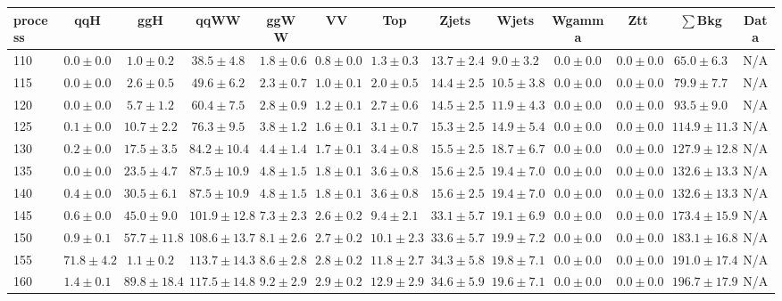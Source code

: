 \begin{table}
{%
 \tiny
 \begin{center}
 \begin{tabular}{l | c c | c c c c c c c c  | c c}
 \hline
 process & qqH & ggH & qqWW & ggWW & VV & Top & Zjets & Wjets & Wgamma & Ztt & $\sum$Bkg & Data \\
 \hline
110 & $0.0\pm0.0$ & $1.0\pm0.2$ & $38.5\pm4.8$ & $1.8\pm0.6$ & $0.8\pm0.0$ & $1.3\pm0.3$ & $13.7\pm2.4$ & $9.0\pm3.2$ & $0.0\pm0.0$ & $0.0\pm0.0$ & $65.0\pm6.3$ & N/A \\
115 & $0.0\pm0.0$ & $2.6\pm0.5$ & $49.6\pm6.2$ & $2.3\pm0.7$ & $1.0\pm0.1$ & $2.0\pm0.5$ & $14.4\pm2.5$ & $10.5\pm3.8$ & $0.0\pm0.0$ & $0.0\pm0.0$ & $79.9\pm7.7$ & N/A \\
120 & $0.0\pm0.0$ & $5.7\pm1.2$ & $60.4\pm7.5$ & $2.8\pm0.9$ & $1.2\pm0.1$ & $2.7\pm0.6$ & $14.5\pm2.5$ & $11.9\pm4.3$ & $0.0\pm0.0$ & $0.0\pm0.0$ & $93.5\pm9.0$ & N/A \\
125 & $0.1\pm0.0$ & $10.7\pm2.2$ & $76.3\pm9.5$ & $3.8\pm1.2$ & $1.6\pm0.1$ & $3.1\pm0.7$ & $15.3\pm2.5$ & $14.9\pm5.4$ & $0.0\pm0.0$ & $0.0\pm0.0$ & $114.9\pm11.3$ & N/A \\
130 & $0.2\pm0.0$ & $17.5\pm3.5$ & $84.2\pm10.4$ & $4.4\pm1.4$ & $1.7\pm0.1$ & $3.4\pm0.8$ & $15.5\pm2.5$ & $18.7\pm6.7$ & $0.0\pm0.0$ & $0.0\pm0.0$ & $127.9\pm12.8$ & N/A \\
135 & $0.0\pm0.0$ & $23.5\pm4.7$ & $87.5\pm10.9$ & $4.8\pm1.5$ & $1.8\pm0.1$ & $3.6\pm0.8$ & $15.6\pm2.5$ & $19.4\pm7.0$ & $0.0\pm0.0$ & $0.0\pm0.0$ & $132.6\pm13.3$ & N/A \\
140 & $0.4\pm0.0$ & $30.5\pm6.1$ & $87.5\pm10.9$ & $4.8\pm1.5$ & $1.8\pm0.1$ & $3.6\pm0.8$ & $15.6\pm2.5$ & $19.4\pm7.0$ & $0.0\pm0.0$ & $0.0\pm0.0$ & $132.6\pm13.3$ & N/A \\
145 & $0.6\pm0.0$ & $45.0\pm9.0$ & $101.9\pm12.8$ & $7.3\pm2.3$ & $2.6\pm0.2$ & $9.4\pm2.1$ & $33.1\pm5.7$ & $19.1\pm6.9$ & $0.0\pm0.0$ & $0.0\pm0.0$ & $173.4\pm15.9$ & N/A \\
150 & $0.9\pm0.1$ & $57.7\pm11.8$ & $108.6\pm13.7$ & $8.1\pm2.6$ & $2.7\pm0.2$ & $10.1\pm2.3$ & $33.6\pm5.7$ & $19.9\pm7.2$ & $0.0\pm0.0$ & $0.0\pm0.0$ & $183.1\pm16.8$ & N/A \\
155 & $71.8\pm4.2$ & $1.1\pm0.2$ & $113.7\pm14.3$ & $8.6\pm2.8$ & $2.8\pm0.2$ & $11.8\pm2.7$ & $34.3\pm5.8$ & $19.8\pm7.1$ & $0.0\pm0.0$ & $0.0\pm0.0$ & $191.0\pm17.4$ & N/A \\
160 & $1.4\pm0.1$ & $89.8\pm18.4$ & $117.5\pm14.8$ & $9.2\pm2.9$ & $2.9\pm0.2$ & $12.9\pm2.9$ & $34.6\pm5.9$ & $19.6\pm7.1$ & $0.0\pm0.0$ & $0.0\pm0.0$ & $196.7\pm17.9$ & N/A \\

\end{tabular}
\end{center}}
\end{table}
